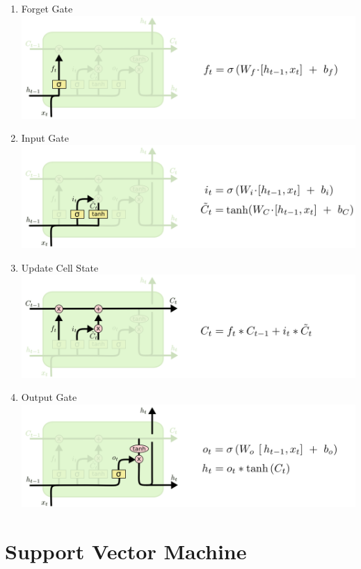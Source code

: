 \documentclass[11pt]{article}
\begin{document}
\begin{enumerate}
	\item Forget Gate \\ 
		\includegraphics[scale=0.5]{./images/LSTM3-focus-f.png}
\item Input Gate \\
 \includegraphics[scale=0.5]{./images/LSTM3-focus-i.png}
\item Update Cell State \\
		\includegraphics[scale=0.5]{./images/LSTM3-focus-C.png}
\item Output Gate	\\
\includegraphics[scale=0.5]{./images/LSTM3-focus-o.png}
\end{enumerate}
\section{Support Vector Machine}
\end{document}

